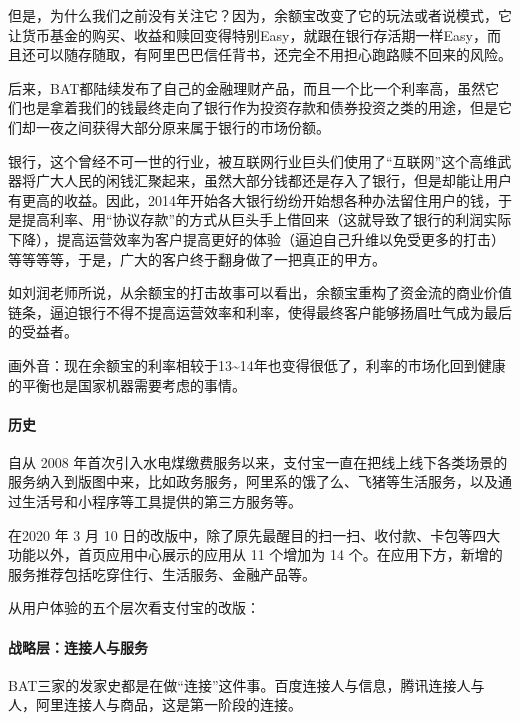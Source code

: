 \documentclass[letterpaper,10pt,english]{sphinxmanual}
\begin{document}
但是，为什么我们之前没有关注它？因为，余额宝改变了它的玩法或者说模式，它让货币基金的购买、收益和赎回变得特别Easy，就跟在银行存活期一样Easy，而且还可以随存随取，有阿里巴巴信任背书，还完全不用担心跑路赎不回来的风险。

后来，BAT都陆续发布了自己的金融理财产品，而且一个比一个利率高，虽然它们也是拿着我们的钱最终走向了银行作为投资存款和债券投资之类的用途，但是它们却一夜之间获得大部分原来属于银行的市场份额。

银行，这个曾经不可一世的行业，被互联网行业巨头们使用了“互联网”这个高维武器将广大人民的闲钱汇聚起来，虽然大部分钱都还是存入了银行，但是却能让用户有更高的收益。因此，2014年开始各大银行纷纷开始想各种办法留住用户的钱，于是提高利率、用“协议存款”的方式从巨头手上借回来（这就导致了银行的利润实际下降），提高运营效率为客户提高更好的体验（逼迫自己升维以免受更多的打击）等等等等，于是，广大的客户终于翻身做了一把真正的甲方。

如刘润老师所说，从余额宝的打击故事可以看出，余额宝重构了资金流的商业价值链条，逼迫银行不得不提高运营效率和利率，使得最终客户能够扬眉吐气成为最后的受益者。

画外音：现在余额宝的利率相较于13\textasciitilde{}14年也变得很低了，利率的市场化回到健康的平衡也是国家机器需要考虑的事情。


\paragraph{历史}
\label{\detokenize{chapter_AI_company/alipay:id3}}
自从 2008
年首次引入水电煤缴费服务以来，支付宝一直在把线上线下各类场景的服务纳入到版图中来，比如政务服务，阿里系的饿了么、飞猪等生活服务，以及通过生活号和小程序等工具提供的第三方服务等。

在2020 年 3 月 10
日的改版中，除了原先最醒目的扫一扫、收付款、卡包等四大功能以外，首页应用中心展示的应用从
11 个增加为 14
个。在应用下方，新增的服务推荐包括吃穿住行、生活服务、金融产品等。

从用户体验的五个层次看支付宝的改版：
%
\begin{footnote}[991]\sphinxAtStartFootnote
{}
%
\end{footnote}


\paragraph{战略层：连接人与服务}
\label{\detokenize{chapter_AI_company/alipay:id4}}
BAT三家的发家史都是在做“连接”这件事。百度连接人与信息，腾讯连接人与人，阿里连接人与商品，这是第一阶段的连接。
\end{document}
